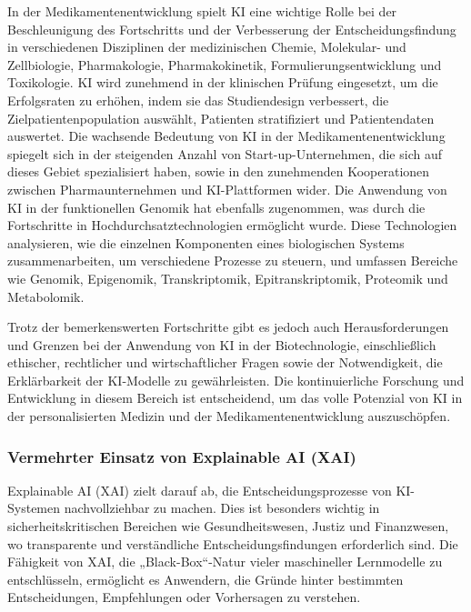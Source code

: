 \documentclass[conference]{IEEEtran}
\begin{document}
In der Medikamentenentwicklung spielt KI eine wichtige Rolle bei der Beschleunigung des Fortschritts und der Verbesserung der Entscheidungsfindung in verschiedenen Disziplinen der medizinischen Chemie, Molekular- und Zellbiologie, Pharmakologie, Pharmakokinetik, Formulierungsentwicklung und Toxikologie. KI wird zunehmend in der klinischen Prüfung eingesetzt, um die Erfolgsraten zu erhöhen, indem sie das Studiendesign verbessert, die Zielpatientenpopulation auswählt, Patienten stratifiziert und Patientendaten auswertet. Die wachsende Bedeutung von KI in der Medikamentenentwicklung spiegelt sich in der steigenden Anzahl von Start-up-Unternehmen, die sich auf dieses Gebiet spezialisiert haben, sowie in den zunehmenden Kooperationen zwischen Pharmaunternehmen und KI-Plattformen wider. Die Anwendung von KI in der funktionellen Genomik hat ebenfalls zugenommen, was durch die Fortschritte in Hochdurchsatztechnologien ermöglicht wurde. Diese Technologien analysieren, wie die einzelnen Komponenten eines biologischen Systems zusammenarbeiten, um verschiedene Prozesse zu steuern, und umfassen Bereiche wie Genomik, Epigenomik, Transkriptomik, Epitranskriptomik, Proteomik und Metabolomik\cite{caudai_ai_2021}. 

Trotz der bemerkenswerten Fortschritte gibt es jedoch auch Herausforderungen und Grenzen bei der Anwendung von KI in der Biotechnologie, einschließlich ethischer, rechtlicher und wirtschaftlicher Fragen sowie der Notwendigkeit, die Erklärbarkeit der KI-Modelle zu gewährleisten. Die kontinuierliche Forschung und Entwicklung in diesem Bereich ist entscheidend, um das volle Potenzial von KI in der personalisierten Medizin und der Medikamentenentwicklung auszuschöpfen\cite{liebman_role_2022}.

\subsubsection{Vermehrter Einsatz von Explainable AI (XAI)}

Explainable AI (XAI) zielt darauf ab, die Entscheidungsprozesse von KI-Systemen nachvollziehbar zu machen. Dies ist besonders wichtig in sicherheitskritischen Bereichen wie Gesundheitswesen, Justiz und Finanzwesen, wo transparente und verständliche Entscheidungsfindungen erforderlich sind. Die Fähigkeit von XAI, die „Black-Box“-Natur vieler maschineller Lernmodelle zu entschlüsseln, ermöglicht es Anwendern, die Gründe hinter bestimmten Entscheidungen, Empfehlungen oder Vorhersagen zu verstehen\cite{barredo_arrieta_explainable_2020}.
\end{document}
